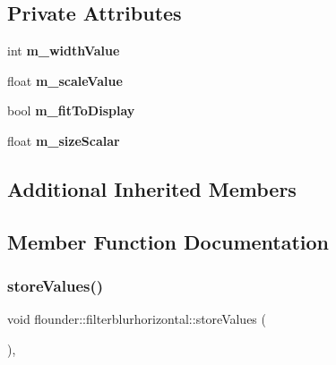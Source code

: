 \subsection*{Private Attributes}
\begin{DoxyCompactItemize}
\item 
\mbox{\label{classflounder_1_1filterblurhorizontal_a7ad006e2db54c64f94123f1dc4918408}} 
int {\bfseries m\+\_\+width\+Value}
\item 
\mbox{\label{classflounder_1_1filterblurhorizontal_a26c12d3356891c151bf9aab649fcd887}} 
float {\bfseries m\+\_\+scale\+Value}
\item 
\mbox{\label{classflounder_1_1filterblurhorizontal_ae867b04caea9cff2e91339c62c834e0a}} 
bool {\bfseries m\+\_\+fit\+To\+Display}
\item 
\mbox{\label{classflounder_1_1filterblurhorizontal_a9cc551f29e574003b393f0ad1eeb2b9d}} 
float {\bfseries m\+\_\+size\+Scalar}
\end{DoxyCompactItemize}
\subsection*{Additional Inherited Members}


\subsection{Member Function Documentation}
\mbox{\label{classflounder_1_1filterblurhorizontal_ad147fceebdebffd0731fc346370021f7}} 
\subsubsection{\texorpdfstring{store\+Values()}{storeValues()}}
{\footnotesize\ttfamily void flounder\+::filterblurhorizontal\+::store\+Values (\begin{DoxyParamCaption}{ }\end{DoxyParamCaption})\hspace{0.3cm}{\ttfamily [override]}, {\ttfamily [virtual]}}



